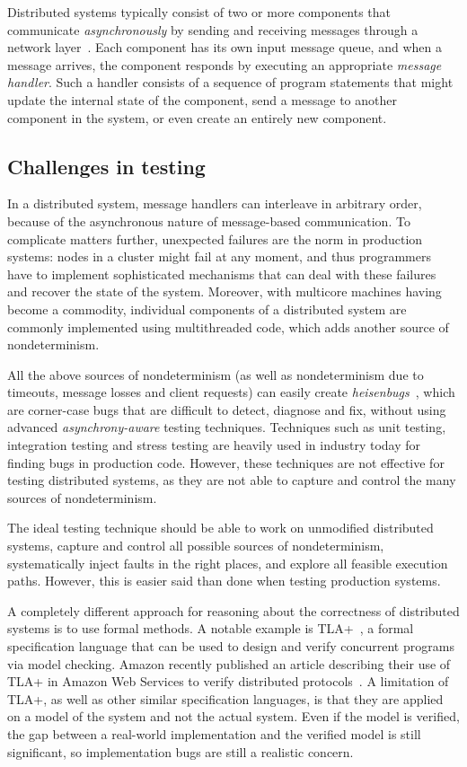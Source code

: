 Distributed systems typically consist of two or more components that communicate \emph{asynchronously} by sending and receiving messages through a network layer~\cite{lamport1978time}. Each component has its own input message queue, and when a message arrives, the component responds by executing an appropriate \emph{message handler}. Such a handler consists of a sequence of program statements that might update the internal state of the component, send a message to another component in the system, or even create an entirely new component.

\subsection{Challenges in testing}
\label{sec:bg:challenges}

In a distributed system, message handlers can interleave in arbitrary order, because of the asynchronous nature of message-based communication. To complicate matters further, unexpected failures are the norm in production systems: nodes in a cluster might fail at any moment, and thus programmers have to implement sophisticated mechanisms that can deal with these failures and recover the state of the system. Moreover, with multicore machines having become a commodity, individual components of a distributed system are commonly implemented using multithreaded code, which adds another source of nondeterminism.

All the above sources of nondeterminism (as well as nondeterminism due to timeouts, message losses and client requests) can easily create \emph{heisenbugs}~\cite{gray1986computers, musuvathi2008finding}, which are corner-case bugs that are difficult to detect, diagnose and fix, without using advanced \emph{asynchrony-aware} testing techniques. Techniques such as unit testing, integration testing and stress testing are heavily used in industry today for finding bugs in production code. However, these techniques are not effective for testing distributed systems, as they are not able to capture and control the many sources of nondeterminism.

The ideal testing technique should be able to work on unmodified distributed systems, capture and control all possible sources of nondeterminism, systematically inject faults in the right places, and explore all feasible execution paths. However, this is easier said than done when testing production systems.

A completely different approach for reasoning about the correctness of distributed systems is to use formal methods.  A notable example is TLA+~\cite{lamport1994temporal}, a formal specification language that can be used to design and verify concurrent programs via model checking. Amazon recently published an article describing their use of TLA+ in Amazon Web Services to verify distributed protocols~\cite{newcombe2015aws}. A limitation of TLA+, as well as other similar specification languages, is that they are applied on a model of the system and not the actual system. Even if the model is verified, the gap between a real-world implementation and the verified model is still significant, so implementation bugs are still a realistic concern.

